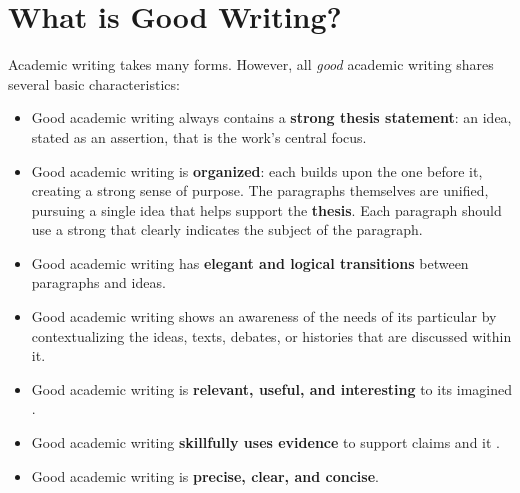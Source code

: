 
\hypertarget{good-writing}{}

\chapter{What is Good Writing?}


Academic writing takes many forms. However, all \emph{good} academic writing shares several basic characteristics:

\begin{itemize}

\item Good academic writing always contains a \textbf{strong thesis statement}: an idea, stated as an assertion, that is the work's central focus.
\item Good academic writing is \textbf{organized}: each \hyperlink{organization}{\color{Ahrenge}{paragraph}} builds upon the one before it, creating a strong sense of purpose. The paragraphs themselves are unified, pursuing a single idea that helps support the \textbf{thesis}. Each paragraph should use a strong \hyperlink{organization}{\color{Ahrenge}{topic sentence}} that clearly indicates the subject of the paragraph.
\item Good academic writing has \textbf{elegant and logical transitions} between paragraphs and ideas.
\item Good academic writing shows an awareness of the needs of its particular \hyperlink{audience}{\color{Ahrenge}{audience}} by contextualizing the ideas, texts, debates, or histories that are discussed within it.
\item Good academic writing is \textbf{relevant, useful, and interesting} to its imagined \hyperlink{audience}{\color{Ahrenge}{audience}}.
\item Good academic writing \textbf{skillfully uses evidence} to support claims and it \hyperlink{sources}{\color{Ahrenge}{properly credits outside sources with citations}}.
\item Good academic writing is \textbf{precise, clear, and concise}.

\end{itemize}

